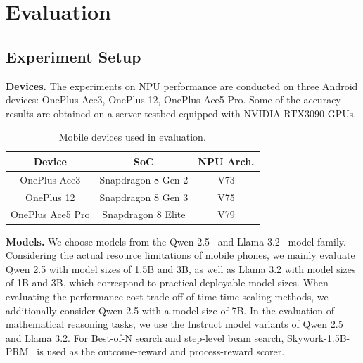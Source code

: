 \section{Evaluation}





\subsection{Experiment Setup}

\textbf{Devices.} The experiments on NPU performance are conducted on three Android devices: OnePlus Ace3, OnePlus 12, OnePlus Ace5 Pro. Some of the accuracy results are obtained on a server testbed equipped with NVIDIA RTX3090 GPUs.

\begin{table}[]
    \centering
    \begin{tabular}{ccc}
        \hline
        Device & SoC & NPU Arch.\\
        \hline
        OnePlus Ace3 & Snapdragon 8 Gen 2 & V73 \\
        OnePlus 12 & Snapdragon 8 Gen 3 & V75 \\
        OnePlus Ace5 Pro & Snapdragon 8 Elite & V79 \\
        \hline
    \end{tabular}
    \caption{Mobile devices used in evaluation.}
    \label{tab:mobile-devices}
    \vspace{-1em}
\end{table}

\textbf{Models.} We choose models from the Qwen 2.5~\cite{qwen25} and Llama 3.2~\cite{llama32} model family. Considering the actual resource limitations of mobile phones, we mainly evaluate Qwen 2.5 with model sizes of 1.5B and 3B, as well as Llama 3.2 with model sizes of 1B and 3B, which correspond to practical deployable model sizes. When evaluating the performance-cost trade-off of time-time scaling methods, we additionally consider Qwen 2.5 with a model size of 7B. In the evaluation of mathematical reasoning tasks, we use the Instruct model variants of Qwen 2.5 and Llama 3.2. For Best-of-N search and step-level beam search, Skywork-1.5B-PRM~\cite{Skywork-o1} is used as the outcome-reward and process-reward scorer.

